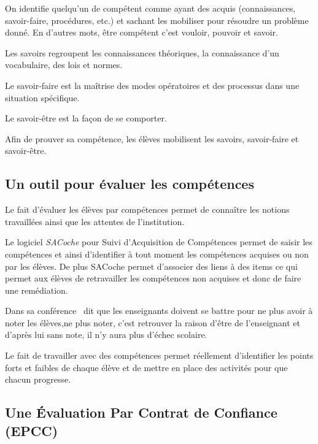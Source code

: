 On identifie quelqu'un de compétent comme ayant des acquis (connaissances, savoir-faire, procédures, etc.) et sachant les mobiliser pour résoudre un problème donné.
En d'autres mots, être compétent c'est vouloir, pouvoir et savoir.

Les savoirs regroupent les connaissances théoriques, la connaissance d'un vocabulaire, des lois et normes.

Le savoir-faire est la maîtrise des modes opératoires et des processus dans une situation spécifique.

Le savoir-être est la façon de se comporter.

Afin de prouver sa compétence, les élèves mobilisent les savoirs, savoir-faire et savoir-être.

\newpage
\subsection{Un outil pour évaluer les compétences}

Le fait d'évaluer les élèves par compétences permet de connaître les notions travaillées ainsi que les attentes de l'institution.

Le logiciel \textit{SACoche} pour Suivi d'Acquisition de Compétences permet de saisir les compétences et ainsi d'identifier à tout moment les compétences acquises ou non par les élèves.
De plus SACoche permet d'associer des liens à des items ce qui permet aux élèves de retravailler les compétences non acquises et donc de faire une remédiation.

Dans sa conférence~\cite{principiano} dit que les enseignants doivent se battre pour ne plus avoir à noter les élèves,ne plus noter, c'est retrouver la raison d'être de l'enseignant et d'après lui sans note, il n'y aura plus d'échec scolaire.

Le fait de travailler avec des compétences permet réellement d'identifier les points forts et faibles de chaque élève et de mettre en place des activités pour que chacun progresse.

\newpage
\subsection{Une Évaluation Par Contrat de Confiance (EPCC)}


